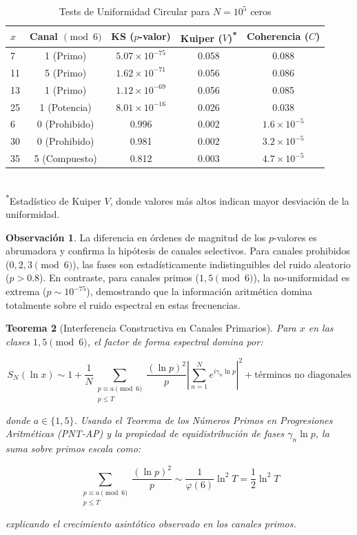 \documentclass[12pt, a4paper]{article}
\theoremstyle{plain}
\newtheorem{teorema}{Teorema}[section]
\theoremstyle{definition}
\newtheorem{observacion}[teorema]{Observación}
\theoremstyle{remark}
\begin{document}
\begin{table}[H]
\centering
\caption{Tests de Uniformidad Circular para $N=10^5$ ceros}
\label{tab:tests_uniformidad}
\begin{tabular}{@{}lcccc@{}}
\toprule
$x$ & Canal $\pmod{6}$ & KS ($p$-valor) & Kuiper ($V$)\textsuperscript{*} & Coherencia ($C$) \\
\midrule
7 & 1 (Primo) & $5.07 \times 10^{-75}$ & 0.058 & 0.088 \\
11 & 5 (Primo) & $1.62 \times 10^{-71}$ & 0.056 & 0.086 \\
13 & 1 (Primo) & $1.12 \times 10^{-69}$ & 0.056 & 0.085 \\
25 & 1 (Potencia) & $8.01 \times 10^{-16}$ & 0.026 & 0.038 \\
6 & 0 (Prohibido) & 0.996 & 0.002 & $1.6 \times 10^{-5}$ \\
30 & 0 (Prohibido) & 0.981 & 0.002 & $3.2 \times 10^{-5}$ \\
35 & 5 (Compuesto) & 0.812 & 0.003 & $4.7 \times 10^{-5}$ \\
\bottomrule
\end{tabular}
\vspace{2mm}\\
\footnotesize{\textsuperscript{*}Estadístico de Kuiper $V$, donde valores más altos indican mayor desviación de la uniformidad.}
\end{table}

\begin{observacion}
La diferencia en órdenes de magnitud de los $p$-valores es abrumadora y confirma la hipótesis de canales selectivos. Para canales prohibidos ($0, 2, 3 \pmod 6$), las fases son estadísticamente indistinguibles del ruido aleatorio ($p > 0.8$). En contraste, para canales primos ($1, 5 \pmod 6$), la no-uniformidad es extrema ($p \sim 10^{-75}$), demostrando que la información aritmética domina totalmente sobre el ruido espectral en estas frecuencias.
\end{observacion}


\begin{teorema}[Interferencia Constructiva en Canales Primarios]
\label{teo:interferencia_constructiva}
Para $x$ en las clases $1,5 \pmod{6}$, el factor de forma espectral domina por:

\[
S_N(\ln x) \sim 1 + \frac{1}{N} \sum_{\substack{p \equiv a \pmod{6} \\ p \leq T}} 
\frac{(\ln p)^2}{p} \left| \sum_{n=1}^N e^{i\gamma_n \ln p} \right|^2 
+ \text{términos no diagonales}
\]

donde $a \in \{1,5\}$. Usando el Teorema de los Números Primos en Progresiones 
Aritméticas (PNT-AP) y la propiedad de equidistribución de fases $\gamma_n \ln p$, 
la suma sobre primos escala como:

\[
\sum_{\substack{p \equiv a \pmod{6} \\ p \leq T}} \frac{(\ln p)^2}{p} \sim 
\frac{1}{\varphi(6)} \ln^2 T = \frac{1}{2} \ln^2 T
\]

explicando el crecimiento asintótico observado en los canales primos.
\end{teorema}
\end{document}
